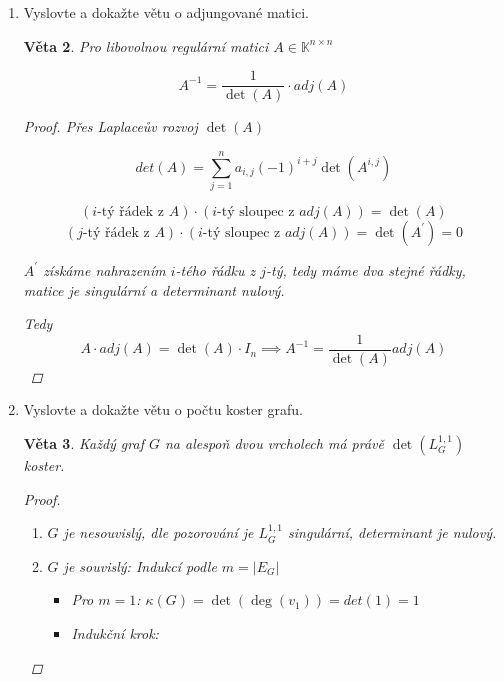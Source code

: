 \documentclass[10pt,a4paper]{article}
\theoremstyle{plain}
\newtheorem{veta}{Věta}
\theoremstyle{definition}
\begin{document}
\begin{enumerate}
\begin{veta}
\begin{proof}

Uvažme matici $I_{i \to x}$

\[A \cdot I_{i \to x} = A_{i \to b} \]
\[\implies \det(A) \det(I_{i \to x}) = \det(A_{i \to b}) \]
\[x_i = det(I_{i \to x}) \]
\[\implies x_i = \frac1{\det(A)}\det(A_{i \to b}) \]

\end{proof}
\end{veta}

\item Vyslovte a dokažte větu o adjungované matici.

\begin{veta}
Pro libovolnou regulární matici $A \in \mathbb{K}^{n \times n}$

\[ A^{-1} = \frac1{\det(A)}\cdot adj(A)\]

\begin{proof}

Přes Laplaceův rozvoj $\det(A)$

\[ det(A) = \sum^n_{j=1} a_{i,j} (-1)^{i+j} \det(A^{i,j})\]

\hfill

\[ (i\text{-tý řádek z }A)\cdot(i\text{-tý sloupec z }adj(A)) = \det(A) \]
\[ (j\text{-tý řádek z }A)\cdot(i\text{-tý sloupec z }adj(A)) = \det(A^\prime) = 0 \]

$A^\prime$ získáme nahrazením $i$-tého řádku z $j$-tý, tedy máme dva stejné řádky, matice je singulární a determinant nulový.

Tedy
\[ A \cdot adj(A) = \det(A) \cdot I_n \implies A^{-1} = \frac1{\det(A)} adj(A)\]


\end{proof}
\end{veta}

\item Vyslovte a dokažte větu o počtu koster grafu.


\begin{veta}
Každý graf $G$ na alespoň dvou vrcholech má právě $\det(L_G^{1,1})$ koster.
\begin{proof}

\begin{enumerate}[label=(\alph*)]
\item $G$ je nesouvislý, dle pozorování je $L_G^{1,1}$ singulární, determinant je nulový.
\item $G$ je souvislý: Indukcí podle $m = |E_G|$

\begin{itemize}
\item Pro $m = 1$: $\kappa(G) = \det(\deg(v_1)) = det(1) = 1$
\item Indukční krok:




\end{itemize}
\end{enumerate}
\end{proof}
\end{veta}
\end{enumerate}
\end{document}

